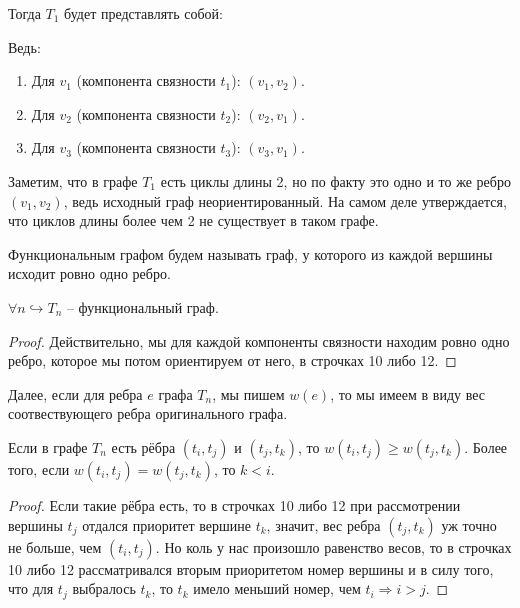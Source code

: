 Тогда $T_1$ будет представлять собой:
\begin{figure}[H]
    \centering
\end{figure}

Ведь:
\begin{enumerate}
    \item Для $v_1$ (компонента связности $t_1$): $(v_1, v_2)$.
    \item Для $v_2$ (компонента связности $t_2$): $(v_2, v_1)$.
    \item Для $v_3$ (компонента связности $t_3$): $(v_3, v_1)$.
\end{enumerate}

\Note Заметим, что в графе $T_1$ есть циклы длины 2, но по факту это одно и то же ребро $(v_1, v_2)$, ведь исходный граф неориентированный. На самом деле утверждается, что циклов длины более чем 2 не существует в таком графе.

\Def Функциональным графом будем называть граф, у которого из каждой вершины исходит ровно одно ребро.

\St $\forall n \hookrightarrow \text{$T_n$ -- функциональный граф}$.
\begin{proof}
    
    Действительно, мы для каждой компоненты связности находим ровно одно ребро, которое мы потом ориентируем от него, в строчках 10 либо 12.

\end{proof}

Далее, если для ребра $e$ графа $T_n$, мы пишем $w(e)$, то мы имеем в виду вес соотвествующего ребра оригинального графа.

 Если в графе $T_n$ есть рёбра $(t_i, t_j)$ и $(t_j, t_k)$, то $w(t_i, t_j) \geq w(t_j, t_k)$. Более того, если $w(t_i, t_j) = w(t_j, t_k)$, то $k < i$.
\begin{proof}
    
    Если такие рёбра есть, то в строчках 10 либо 12 при рассмотрении вершины $t_j$ отдался приоритет вершине $t_k$, значит, вес ребра $(t_j, t_k)$ уж точно не больше, чем $(t_i, t_j)$.
    Но коль у нас произошло равенство весов, то в строчках 10 либо 12 рассматривался вторым приоритетом номер вершины и в силу того, что для $t_j$ выбралось $t_k$, то $t_k$ имело меньший номер, чем $t_i \Rightarrow i > j$.

\end{proof}

